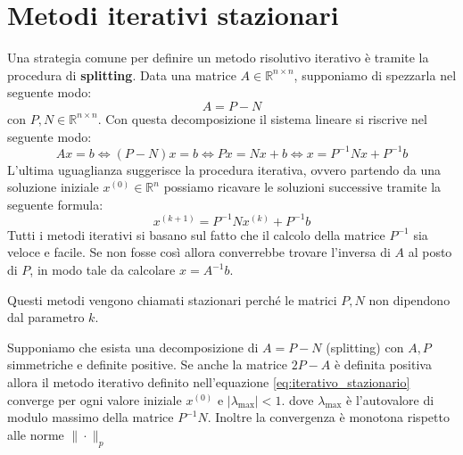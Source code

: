 \section{Metodi iterativi stazionari}
Una strategia comune per definire un metodo risolutivo iterativo è tramite la
procedura di \textbf{splitting}. Data una matrice $A \in \mathbb{R}^{n \times n}$,
supponiamo di spezzarla nel seguente modo:
\begin{equation*}
    A=P-N
\end{equation*}
con $P, N \in \mathbb{R}^{n \times n}$. Con questa decomposizione il sistema lineare
si riscrive nel seguente modo:
\begin{equation*}
    Ax = b \iff (P - N)x = b \iff Px = Nx + b \iff x = P^{-1}Nx + P^{-1}b
\end{equation*}
L'ultima uguaglianza suggerisce la procedura iterativa, ovvero partendo da una
soluzione iniziale $x^{(0)} \in \mathbb{R}^n$ possiamo ricavare le soluzioni
successive tramite la seguente formula:
\begin{equation}
    x^{(k + 1)} =  P^{-1}Nx^{(k)} + P^{-1}b
    \label{eq:iterativo_stazionario}
\end{equation}
Tutti i metodi iterativi si basano sul fatto che il calcolo della matrice $P^{-1}$
sia veloce e facile. Se non fosse così allora converrebbe trovare l'inversa di
$A$ al posto di $P$, in modo tale da calcolare $x=A^{-1}b$.

Questi metodi vengono chiamati stazionari perché le matrici $P, N$ non dipendono
dal parametro $k$.
\begin{teorema}\label{th:metodi_iterativi}
    Supponiamo che esista una decomposizione di $A=P - N $ (splitting) con $A, P$
    simmetriche e definite positive. Se anche la matrice $2P - A$ è definita
    positiva allora il metodo iterativo definito nell'equazione \ref{eq:iterativo_stazionario}
    converge per ogni valore iniziale $x^{(0)}$ e $|\lambda_{\max}| < 1$. dove
    $\lambda_{\max}$ è l'autovalore di modulo massimo della matrice $P^{-1}N$.
    Inoltre la convergenza è monotona rispetto alle norme $\|\cdot\|_p$
\end{teorema}

